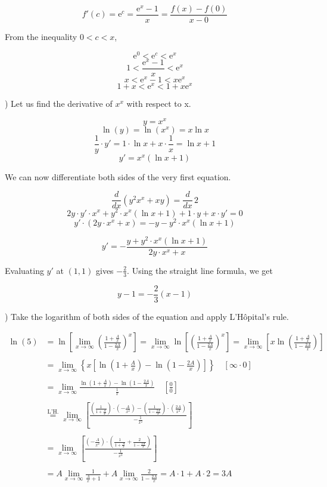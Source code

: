 \documentclass{article}
\begin{document}
\[
f'(c) = \mathrm{e}^c=\frac{\mathrm{e}^x-1}x=\frac{f(x)-f(0)}{x-0}
\]

\hfill

\noindent From the inequality $0<c<x$,

\[\mathrm{e}^0<\mathrm{e}^c<\mathrm{e}^x\]
\[1<\frac{\mathrm{e}^x-1}x<\mathrm{e}^x\]
\[x<\mathrm{e}^x-1 <x\mathrm{e}^x\]
\[1+x<\mathrm{e}^x <1+x\mathrm{e}^x\]

\hfill

) Let us find the derivative of $x^x$ with respect to x.

\[y=x^x\]
\[\ln(y)=\ln(x^x) = x\ln x\]
\[\frac1y\cdot y'=1\cdot\ln x + x\cdot \frac1x = \ln x +1\]
\[y'=x^x(\ln x+1)\]

\hfill

\noindent We can now differentiate both sides of the very first equation.

\[\frac d{dx}\left(y^2x^x + xy\right) = \frac d{dx}\,2\]
\[2y\cdot y'\cdot x^x + y^2\cdot x^x(\ln x+1)+1\cdot y +x\cdot y'=0\]
\[y'\cdot\left(2y\cdot x^x + x\right)=-y-y^2\cdot x^x(\ln x+1)\]

\[y'=-\frac{y+y^2\cdot x^x(\ln x+1)}{2y\cdot x^x+x}\]

\hfill

\noindent Evaluating $y'$ at $(1,1)$ gives $\displaystyle-\frac23$. Using the straight line formula, we get

\[
\boxed{y-1 =-\frac23(x-1)}
\]

\newpage

) Take the logarithm of both sides of the equation and apply L'Hôpital's rule.

\begin{align*}
\ln(5)&=\ln\left[\lim_{x\to\infty}\left(\frac{\displaystyle1+\frac Ax}{\displaystyle1-\frac {2A}x}\right)^{x}\right]=\lim_{x\to\infty}\ln\left[\left(\frac{\displaystyle1+\frac Ax}{\displaystyle1-\frac {2A}x}\right)^{x}\right]=\lim_{x\to\infty}\left[x\ln\left(\frac{\displaystyle1+\frac Ax}{\displaystyle1-\frac {2A}x}\right)\right]\\\\&=\lim_{x\to\infty}\left\{x\left[\ln\left(1+\frac Ax\right)-\ln\left(1-\frac {2A}x\right)\right]\right\}\quad\left[\infty\cdot0\right]\\\\&=\lim_{x\to\infty}\frac{\displaystyle\ln\left(1+\frac Ax\right)-\ln\left(1-\frac {2A}x\right)}{\displaystyle\frac1x}\quad\left[\frac00\right]\\\\&\overset{\text{L'H.}}{=}\lim_{x\to\infty}\left[\frac{\displaystyle\left(\frac1{1+\frac Ax}\right)\cdot\left(-\frac{A}{x^2}\right)-\left(\frac1{1-\frac{2A}x}\right)\cdot\left(\frac{2A}{x^2}\right)}{\displaystyle -\frac1{x^2}}\right]\\\\&=\lim_{x\to\infty}\left[\frac{\displaystyle\left(-\frac{A}{x^2}\right)\cdot\left(\frac1{1+\frac{A}x}+\frac{2}{1-\frac{2A}x}\right)}{\displaystyle-\frac{1}{x^2}}\right]\\\\&=A\lim_{x\to\infty}\frac1{\frac Ax + 1}+A\lim_{x\to\infty}\frac2{1-\frac{2A}x} = A \cdot 1 + A \cdot 2 = 3A
\end{align*}
\end{document}
